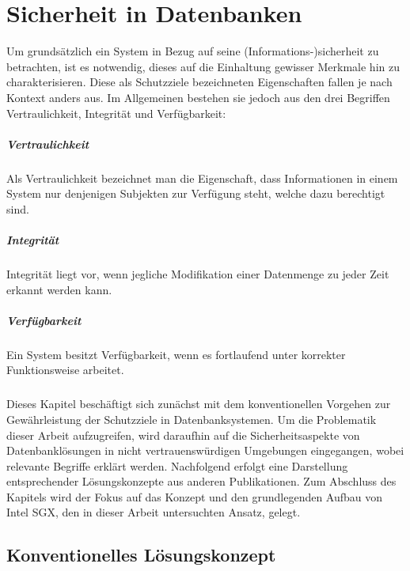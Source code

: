 
\chapter{Sicherheit in Datenbanken}

Um grundsätzlich ein System in Bezug auf seine (Informations-)sicherheit zu betrachten, ist es notwendig, dieses auf die Einhaltung gewisser Merkmale hin zu charakterisieren. Diese als Schutzziele bezeichneten Eigenschaften fallen je nach Kontext anders aus. Im Allgemeinen bestehen sie jedoch aus den drei Begriffen Vertraulichkeit, Integrität und Verfügbarkeit:

\paragraph{Vertraulichkeit}
Als Vertraulichkeit bezeichnet man die Eigenschaft, dass Informationen in einem System nur denjenigen Subjekten zur Verfügung steht, welche dazu berechtigt sind.

\paragraph{Integrität}
Integrität liegt vor, wenn jegliche Modifikation einer Datenmenge zu jeder Zeit erkannt werden kann.

\paragraph{Verfügbarkeit}
Ein System besitzt Verfügbarkeit, wenn es fortlaufend unter korrekter Funktionsweise arbeitet.

\paragraph{}
Dieses Kapitel beschäftigt sich zunächst mit dem konventionellen Vorgehen zur Gewährleistung der Schutzziele in Datenbanksystemen. Um die Problematik dieser Arbeit aufzugreifen, wird daraufhin auf die Sicherheitsaspekte von Datenbanklösungen in nicht vertrauenswürdigen Umgebungen eingegangen, wobei relevante Begriffe erklärt werden. Nachfolgend erfolgt eine Darstellung entsprechender Lösungskonzepte aus anderen Publikationen. Zum Abschluss des Kapitels wird der Fokus auf das Konzept und den grundlegenden Aufbau von Intel SGX, den in dieser Arbeit untersuchten Ansatz, gelegt.

\section{Konventionelles Lösungskonzept}

